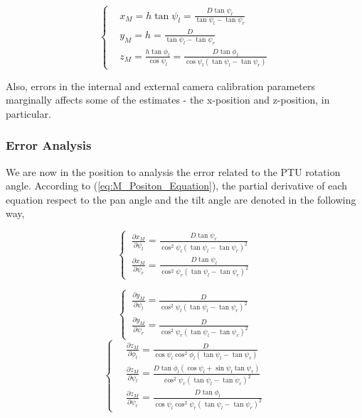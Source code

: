 \begin{equation}
\left \{
\begin{aligned}
&x_M = h \tan \psi_l = \frac{D\tan \psi_l}{\tan \psi_l - \tan \psi_r}            \\
&y_M = h = \frac{D}{\tan \psi_l - \tan \psi_r} \\
&z_M = \frac{h\tan \phi_l}{\cos \psi_l} = \frac{D\tan \phi_l}{\cos \psi_l(\tan \psi_l - \tan \psi_r)}
\end{aligned} \right.
\label{eq:M_Positon_Equation}
\end{equation} 


Also, errors in the internal and external camera calibration parameters marginally affects some of the estimates - the x-position and z-position, in particular.

\subsubsection{Error Analysis}
We are now in the position to analysis the error related to the PTU rotation angle. According to (\ref{eq:M_Positon_Equation}), the partial derivative of each equation respect to the pan angle and the tilt angle are denoted in the following way,

\begin{equation}
	\left\{ \,
	\begin{aligned}
		\frac{ \partial x_M}{ \partial \psi_l} = \frac{D \tan \psi_r}{ \cos^2 \psi_l (\tan \psi_l - \tan \psi_r)^2} \\
		\frac{ \partial x_M}{\partial \psi_r} = \frac{D \tan \psi_l}{\cos^2 \psi_r (\tan \psi_l - \tan \psi_r)^2} 
	\end{aligned}
	\right.
\end{equation}

\begin{equation}
	\left\{ \,
	\begin{aligned}
		\frac{\partial y_M}{\partial \psi_l} = \frac{ D}{\cos^2 \psi_l (\tan \psi_l - \tan \psi_r)^2} \\
		\frac{\partial y_M}{\partial \psi_r} = \frac{D}{\cos^2 \psi_r (\tan \psi_l - \tan \psi_r)^2} 
	\end{aligned}
	\right.	
\end{equation}
\begin{equation}
	\left\{ \,
	\begin{aligned}
		&\frac{ \partial z_M}{ \partial \phi_l} = \frac{D}{ \cos \psi_l \cos^2 \phi_l (\tan \psi_l - \tan \psi_r)} \\
		&\frac{\partial z_M}{\partial \psi_l} = \frac{ D \tan \phi_l(\cos \psi_l + \sin \psi_l \tan \psi_r)}{ \cos^2 \psi_r (\tan \psi_l - \tan \psi_r)^2} \\
		&\frac{ \partial z_M}{ \partial \psi_r} = \frac{ D \tan \phi_l}{ \cos \psi_l \cos^2 \psi_r (\tan \psi_l - \tan \psi_r)^2}
	\end{aligned}
	\right.
\end{equation} 

